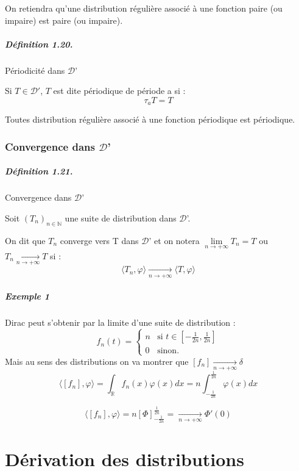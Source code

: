 \documentclass[12pt,a4paper]{report}
\newcommand{\ens}[1]{\ensuremath{\mathbb{#1}}}
\newcommand{\D}{\ensuremath{\mathcal{D}}}
\begin{document}
On retiendra qu'une distribution régulière associé à une fonction paire (ou impaire) est paire (ou impaire).

\paragraph{Définition 1.20.} Périodicité dans \D'

Si \(T \in \D'\), \(T\) est dite périodique de période a si :
\[
	\tau_a T = T
\]

Toutes distribution régulière associé à une fonction périodique est périodique.

\subsection{Convergence dans \D'}

\paragraph{Définition 1.21.} Convergence dans \D'

Soit \((T_n)_{n\in\ens{N}}\) une suite de distribution dans \D'.

On dit que \(T_n\) converge vers T dans \D' et on notera \(\underset{n \rightarrow +\infty}{\lim} T_n = T\) ou \(T_n \underset{n \rightarrow +\infty}{\rightarrow} T\) si :
\[
	\langle T_n, \varphi \rangle \underset{n \rightarrow +\infty}{\rightarrow} \langle T, \varphi \rangle
\]

\paragraph{Exemple 1} Dirac peut s'obtenir par la limite d'une suite de distribution :
\[
	f_n(t) = \left\{
    \begin{array}{ll}
        n & \mbox{si } t \in [-\frac{1}{2n}, \frac{1}{2n}] \\
        0 & \mbox{sinon.}
    \end{array}
\right.
\]
Mais au sens des distributions on va montrer que \([f_n] \underset{n \rightarrow +\infty}{\rightarrow} \delta\)
\[
	\langle [f_n], \varphi \rangle = \int_{\ens{R}} f_n(x) \varphi(x) dx = n \int_{-\frac{1}{2n}}^{\frac{1}{2n}} \varphi(x) dx
\]

\[
	\langle [f_n], \varphi \rangle = n \left[ \Phi \right]_{-\frac{1}{2n}}^{\frac{1}{2n}} = \underset{n \rightarrow +\infty}{\rightarrow} \Phi' (0)
\]

\chapter{Dérivation des distributions}
\end{document}
